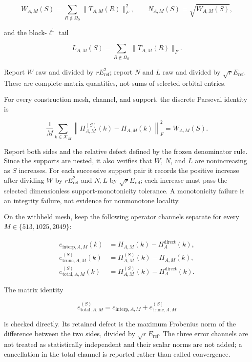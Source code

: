 \documentclass[11pt]{article}
\begin{document}
\[
W_{A,M}(S)=\sum_{R\notin\Omega_S}\|T_{A,M}(R)\|_F^2,
\qquad
N_{A,M}(S)=\sqrt{W_{A,M}(S)},
\]

and the block-$\ell^1$ tail

\[
L_{A,M}(S)=\sum_{R\notin\Omega_S}\|T_{A,M}(R)\|_F.
\]

Report $W$ raw and divided by $rE_{\mathrm{ref}}^2$; report $N$ and $L$ raw and divided
by $\sqrt rE_{\mathrm{ref}}$. These are complete-matrix quantities, not sums of selected
orbital entries.

For every construction mesh, channel, and support, the discrete Parseval identity is

\begin{equation}
 \frac1M\sum_{k\in\mathcal K_M}
 \left\lVert H_{A,M}^{(S)}(k)-H_{A,M}(k)\right\rVert_F^2
 =W_{A,M}(S).
 \label{eq:diagnostic-parseval}
\end{equation}

Report both sides and the relative defect defined by the frozen denominator
rule. Since the supports are nested, it also verifies that $W$, $N$, and $L$ are
nonincreasing as $S$ increases. For each successive support pair it records the positive
increase after dividing $W$ by $rE_{\mathrm{ref}}^2$ and $N,L$ by
$\sqrt rE_{\mathrm{ref}}$; each increase must pass the selected dimensionless
support-monotonicity tolerance. A monotonicity failure is an integrity failure, not
evidence for nonmonotone locality.

On the withheld mesh, keep the following operator channels separate for every
$M\in\{513,1025,2049\}$:

\begin{equation}
\begin{aligned}
e_{\mathrm{interp},A,M}(k)
 &=H_{A,M}(k)-H_A^{\mathrm{direct}}(k),\\
e_{\mathrm{trunc},A,M}^{(S)}(k)
 &=H_{A,M}^{(S)}(k)-H_{A,M}(k),\\
e_{\mathrm{total},A,M}^{(S)}(k)
 &=H_{A,M}^{(S)}(k)-H_A^{\mathrm{direct}}(k).
\end{aligned}
\label{eq:diagnostic-error-channels}
\end{equation}

The matrix identity

\begin{equation}
 e_{\mathrm{total},A,M}^{(S)}
 =e_{\mathrm{interp},A,M}+e_{\mathrm{trunc},A,M}^{(S)}
 \label{eq:diagnostic-error-decomposition}
\end{equation}

is checked directly. Its retained defect is the maximum Frobenius norm of the difference
between the two sides, divided by $\sqrt rE_{\mathrm{ref}}$. The three error channels are
not treated as statistically independent and their scalar norms are not added; a
cancellation in the total channel is reported rather than called convergence.
\end{document}
